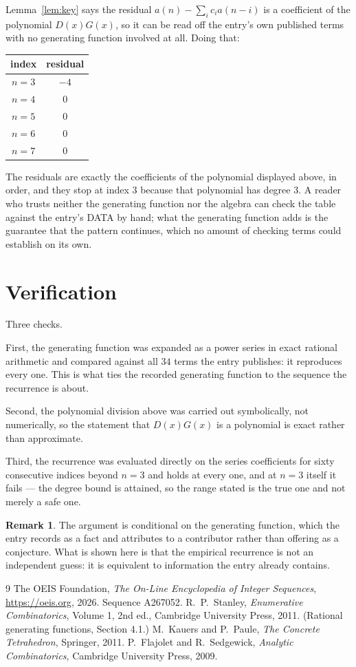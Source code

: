 \documentclass[11pt,a4paper]{article}
\theoremstyle{plain}
\theoremstyle{definition}
\newtheorem{remark}[theorem]{Remark}
\begin{document}
Lemma~\ref{lem:key} says the residual $a(n)-\sum_ic_ia(n-i)$ is a coefficient of the
polynomial $D(x)G(x)$, so it can be read off the entry's own published terms with no
generating function involved at all. Doing that:
\begin{center}
\begin{tabular}{cc}
index & residual \\ \hline
$n=3$ & $-4$ \\
$n=4$ & $0$ \\
$n=5$ & $0$ \\
$n=6$ & $0$ \\
$n=7$ & $0$
\end{tabular}
\end{center}
The residuals are exactly the coefficients of the polynomial displayed above, in order, and
they stop at index $3$ because that polynomial has degree $3$. A reader who trusts
neither the generating function nor the algebra can check the table against the entry's DATA
by hand; what the generating function adds is the guarantee that the pattern continues, which
no amount of checking terms could establish on its own.

\section{Verification}

Three checks.

First, the generating function was expanded as a power series in exact rational arithmetic and
compared against all $34$ terms the entry publishes: it reproduces every one. This is
what ties the recorded generating function to the sequence the recurrence is about.

Second, the polynomial division above was carried out symbolically, not numerically, so the
statement that $D(x)G(x)$ is a polynomial is exact rather than approximate.

Third, the recurrence was evaluated directly on the series coefficients for sixty consecutive
indices beyond $n=3$ and holds at every one, and at $n=3$ itself it fails --- the
degree bound is attained, so the range stated is the true one and not merely a safe one.

\begin{remark}
The argument is conditional on the generating function, which the entry records as a fact and
attributes to a contributor rather than offering as a conjecture. What is shown here is that
the empirical recurrence is not an independent guess: it is equivalent to information the
entry already contains.
\end{remark}

\begin{thebibliography}{9}
 The OEIS Foundation, \emph{The On-Line Encyclopedia of Integer
Sequences}, \url{https://oeis.org}, 2026. Sequence A267052.
 R.~P.~Stanley, \emph{Enumerative Combinatorics}, Volume 1, 2nd ed.,
Cambridge University Press, 2011. (Rational generating functions, Section 4.1.)
 M.~Kauers and P.~Paule, \emph{The Concrete Tetrahedron}, Springer, 2011.
 P.~Flajolet and R.~Sedgewick, \emph{Analytic Combinatorics}, Cambridge
University Press, 2009.
\end{thebibliography}
\end{document}
